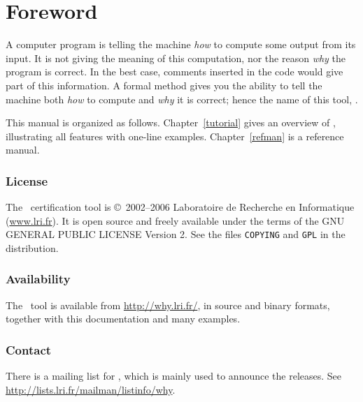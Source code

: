 \documentclass[a4paper,12pt]{report}
\begin{document}


\tableofcontents

\chapter*{Foreword}

A computer program is telling the machine \emph{how} to compute some
output from its input. It is not giving the meaning of this
computation, nor the reason \emph{why} the program is correct. In the
best case, comments inserted in the code would give part of this
information. A formal method gives you the ability to tell the
machine both \emph{how} to compute and \emph{why} it is correct; hence
the name of this tool, \why.


\medskip

This manual is organized as follows. Chapter~\ref{tutorial} gives an
overview of \why, illustrating all features with one-line examples.
Chapter~\ref{refman} is a reference manual.


\subsection*{License}

The \why\ certification tool is \copyright\ 2002--2006 Laboratoire de
Recherche en Informatique (\url{www.lri.fr}).
It is open source and freely available under the terms of the GNU
GENERAL PUBLIC LICENSE Version 2. See the files \texttt{COPYING} and
\texttt{GPL} in the distribution.


\subsection*{Availability}

The \why\ tool is available from \url{http://why.lri.fr/}, in source
and binary formats, together with this documentation and many
examples.


\subsection*{Contact}

There is a mailing list for \why, which is mainly used to announce the
releases. See \url{http://lists.lri.fr/mailman/listinfo/why}.
\end{document}
